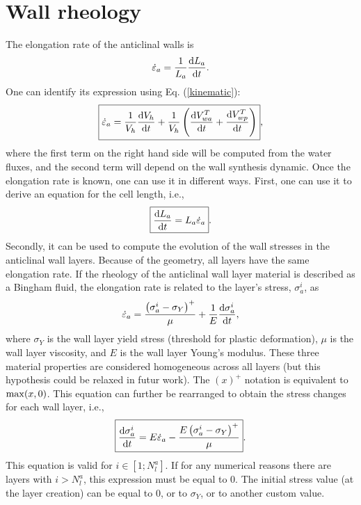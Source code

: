 \documentclass[]{article}
\begin{document}
\section{Wall rheology}
The elongation rate of the anticlinal walls is
\begin{equation}
	\dot{\varepsilon}_a=\frac{1}{L_a}\frac{{\rm d} L_a}{{\rm d} t}.
\end{equation}
One can identify its expression using Eq. (\ref{kinematic}):
\begin{equation}
	\boxed{
	\dot{\varepsilon}_a = \frac{1}{V_h}\frac{{\rm d} V_h}{{\rm d} t} + \frac{1}{V_h}\left(\frac{{\rm d} V_{wa}^T}{{\rm d} t} +\frac{{\rm d} V_{wp}^T}{{\rm d} t} \right)},
\end{equation}
where the first term on the right hand side will be computed from the water fluxes, and the second term will depend on the wall synthesis dynamic.
Once the elongation rate is known, one can use it in different ways. First, one can use it to derive an equation for the cell length, i.e.,
\begin{equation}
	\boxed{
	\frac{{\rm d} L_a}{{\rm d} t}=L_a\dot{\varepsilon}_a}.
\end{equation}
Secondly, it can be used to compute the evolution of the wall stresses in the anticlinal wall layers. Because of the geometry, all layers have the same elongation rate. If the rheology of the anticlinal wall layer material is described as a Bingham fluid, the elongation rate is related to the layer's stress, $\sigma_a^i$, as
\begin{equation}
	\dot{\varepsilon}_a=\frac{\left(\sigma_a^i-\sigma_Y\right)^+}{\mu}+\frac{1}{E}\frac{{\rm d} \sigma_a^i}{{\rm d} t},
\end{equation}
where $\sigma_Y$ is the wall layer yield stress (threshold for plastic deformation), $\mu$ is the wall layer viscosity, and $E$ is the wall layer Young's modulus. These three material properties are considered homogeneous across all layers (but this hypothesis could be relaxed in futur work). The $(x)^+$ notation is equivalent to ${\rm max} (x,0)$.
This equation can further be rearranged to obtain the stress changes for each wall layer, i.e.,
\begin{equation}
	\boxed{
	\frac{{\rm d} \sigma_a^i}{{\rm d} t}= E \dot{\varepsilon}_a- \frac{E\left(\sigma_a^i-\sigma_Y\right)^+}{\mu}}.
\end{equation}
This equation is valid for $i \in [1;N_l^a]$. If for any numerical reasons there are layers with $i>N_l^a$, this expression must be equal to 0. The initial stress value (at the layer creation) can be equal to 0, or to $\sigma_Y$, or to another custom value.
\end{document}
